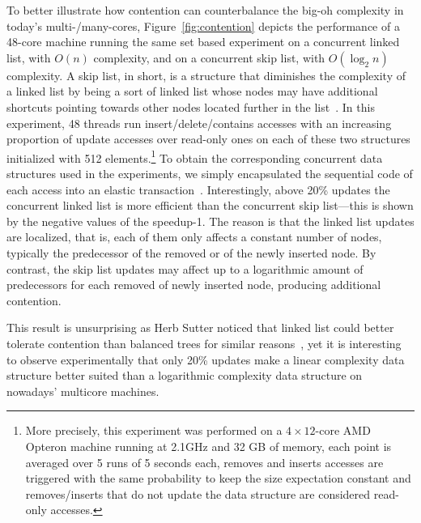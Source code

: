 To better illustrate how contention can counterbalance the big-oh complexity  
in today's multi-/many-cores, Figure~\ref{fig:contention} depicts the performance
of a 48-core machine running the same set based experiment on a concurrent linked list, with $O(n)$ complexity,
and on a concurrent skip list, with $O(\log_2 n)$ complexity. 
A skip list, in short, is a structure that diminishes the complexity
of a linked list by being a sort of linked list 
whose nodes may have additional shortcuts pointing towards other nodes 
located further in the list~\cite{Pug90}. %
In this experiment, 48 threads run insert/delete/contains accesses with an increasing proportion of 
update accesses over read-only ones on each of these two structures initialized with 512 
elements.\footnote{More precisely, this experiment was performed on a $4\times 12$-core AMD 
Opteron machine running at 2.1GHz and 32 GB of memory, each point is averaged 
over 5 runs of 5 seconds each, removes and inserts accesses are triggered with the same probability to keep the 
size expectation constant and removes/inserts that do not update the data structure are considered 
read-only accesses.}  To obtain the corresponding concurrent data structures used in the experiments, we simply encapsulated the 
sequential code of each access into an elastic transaction~\cite{FGG09}.
Interestingly, above 20\% updates the concurrent linked list is more efficient than the concurrent
skip list---this is shown by the negative values of the speedup-1. The reason is that the linked list 
updates are localized, that is, each of them only affects a constant number of nodes, typically the 
predecessor of the removed or of the newly inserted node. By contrast, the skip list updates 
may affect up to a logarithmic amount of predecessors for each removed of newly inserted node, 
producing additional contention.

This result is unsurprising as Herb Sutter noticed that linked list could better tolerate contention 
than balanced 
trees for similar reasons~\cite{Sut08}, yet it is interesting to observe experimentally that only 20\% 
updates make 
a linear complexity data structure better suited than a logarithmic complexity data structure on 
nowadays' multicore machines. 

